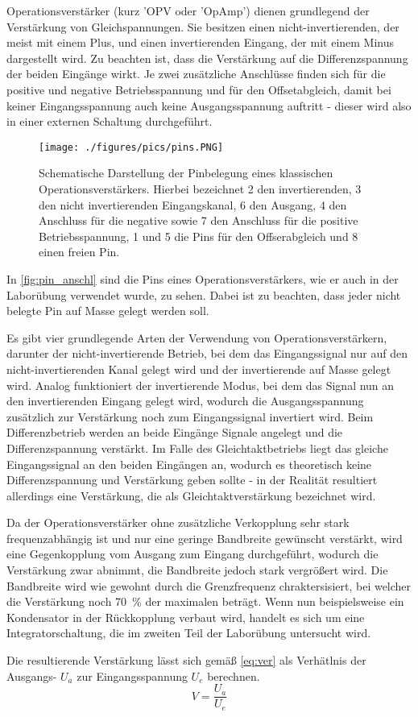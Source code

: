 Operationsverstärker (kurz 'OPV oder 'OpAmp') dienen grundlegend der Verstärkung von 
Gleichspannungen. Sie besitzen einen nicht-invertierenden, der meist mit einem 
Plus, und einen invertierenden Eingang, der mit einem Minus dargestellt wird. Zu 
beachten ist, dass die Verstärkung auf die Differenzspannung der beiden Eingänge 
wirkt. Je zwei zusätzliche Anschlüsse finden sich für die positive und negative 
Betriebsspannung und für den Offsetabgleich, damit bei keiner Eingangsspannung 
auch keine Ausgangsspannung auftritt - dieser wird also in einer externen 
Schaltung durchgeführt.

\begin{figure}[H]
    \centering
    \texttt{[image: ./figures/pics/pins.PNG]}
    \caption{Schematische Darstellung der Pinbelegung eines klassischen Operationsverstärkers. Hierbei bezeichnet 2 den invertierenden, 3 den nicht invertierenden Eingangskanal, 6 den Ausgang, 4 den Anschluss für die negative sowie 7 den Anschluss für die positive Betriebsspannung, 1 und 5 die Pins für den Offserabgleich und 8 einen freien Pin.  \cite{tietze}}
    \label{fig:pin_anschl}
\end{figure}

In \autoref{fig:pin_anschl} sind die Pins eines Operationsverstärkers, wie er auch 
in der Laborübung verwendet wurde, zu sehen. Dabei ist zu beachten, dass jeder nicht 
belegte Pin auf Masse gelegt werden soll.

Es gibt vier grundlegende Arten der Verwendung von Operationsverstärkern, darunter
der nicht-invertierende Betrieb, bei dem das Eingangssignal nur auf den nicht-invertierenden 
Kanal gelegt wird und der invertierende auf Masse gelegt wird. Analog funktioniert der invertierende 
Modus, bei dem das Signal nun an den invertierenden Eingang gelegt wird, wodurch die Ausgangsspannung 
zusätzlich zur Verstärkung noch zum Eingangssignal invertiert wird. Beim Differenzbetrieb werden an 
beide Eingänge Signale angelegt und die Differenzspannung verstärkt. Im Falle des Gleichtaktbetriebs 
liegt das gleiche Eingangssignal an den beiden Eingängen an, wodurch es theoretisch keine Differenzspannung 
und Verstärkung geben sollte - in der Realität resultiert allerdings eine Verstärkung, die als 
Gleichtaktverstärkung bezeichnet wird.

Da der Operationsverstärker ohne zusätzliche Verkopplung sehr stark frequenzabhängig ist und 
nur eine geringe Bandbreite gewünscht verstärkt, wird eine Gegenkopplung vom Ausgang zum Eingang 
durchgeführt, wodurch die Verstärkung zwar abnimmt, die Bandbreite jedoch stark vergrößert wird. 
Die Bandbreite wird wie gewohnt durch die Grenzfrequenz chraktersisiert, bei welcher die Verstärkung 
noch \SI{70}{\%} der maximalen beträgt. Wenn nun beispielsweise ein Kondensator in der Rückkopplung verbaut wird, 
handelt es sich um eine Integratorschaltung, die im zweiten Teil der Laborübung untersucht wird.

Die resultierende Verstärkung lässt sich gemäß \autoref{eq:ver} als Verhätlnis der Ausgangs- $U_a$ zur Eingangsspannung $U_e$ berechnen.
\begin{equation}
	V=\frac{U_a}{U_e}
	\label{eq:ver}
\end{equation}
